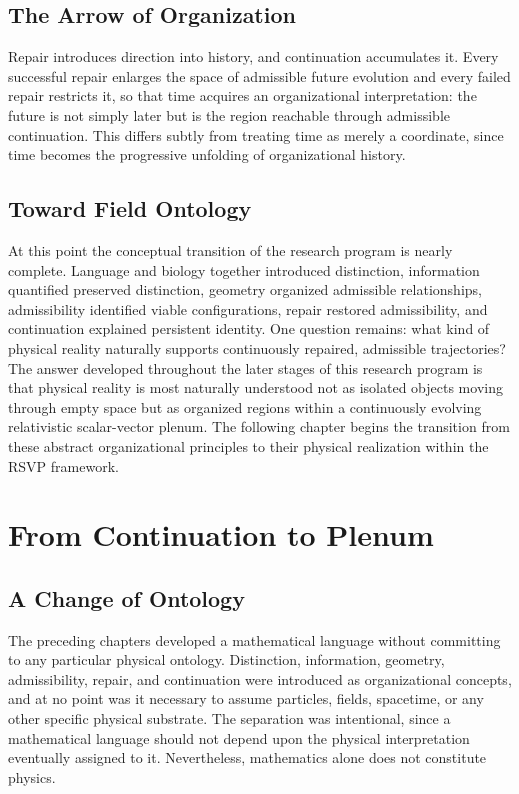 \documentclass[11pt,oneside]{book}
\numberwithin{equation}{chapter}
\theoremstyle{definition}
\theoremstyle{plain}
\begin{document}
\section{The Arrow of Organization}

Repair introduces direction into history, and continuation accumulates it. Every successful repair enlarges the space of admissible future evolution and every failed repair restricts it, so that time acquires an organizational interpretation: the future is not simply later but is the region reachable through admissible continuation. This differs subtly from treating time as merely a coordinate, since time becomes the progressive unfolding of organizational history.

\section{Toward Field Ontology}

At this point the conceptual transition of the research program is nearly complete. Language and biology together introduced distinction, information quantified preserved distinction, geometry organized admissible relationships, admissibility identified viable configurations, repair restored admissibility, and continuation explained persistent identity. One question remains: what kind of physical reality naturally supports continuously repaired, admissible trajectories? The answer developed throughout the later stages of this research program is that physical reality is most naturally understood not as isolated objects moving through empty space but as organized regions within a continuously evolving relativistic scalar-vector plenum. The following chapter begins the transition from these abstract organizational principles to their physical realization within the RSVP framework.

\chapter{From Continuation to Plenum}

\section{A Change of Ontology}

The preceding chapters developed a mathematical language without committing to any particular physical ontology. Distinction, information, geometry, admissibility, repair, and continuation were introduced as organizational concepts, and at no point was it necessary to assume particles, fields, spacetime, or any other specific physical substrate. The separation was intentional, since a mathematical language should not depend upon the physical interpretation eventually assigned to it. Nevertheless, mathematics alone does not constitute physics.
\end{document}
